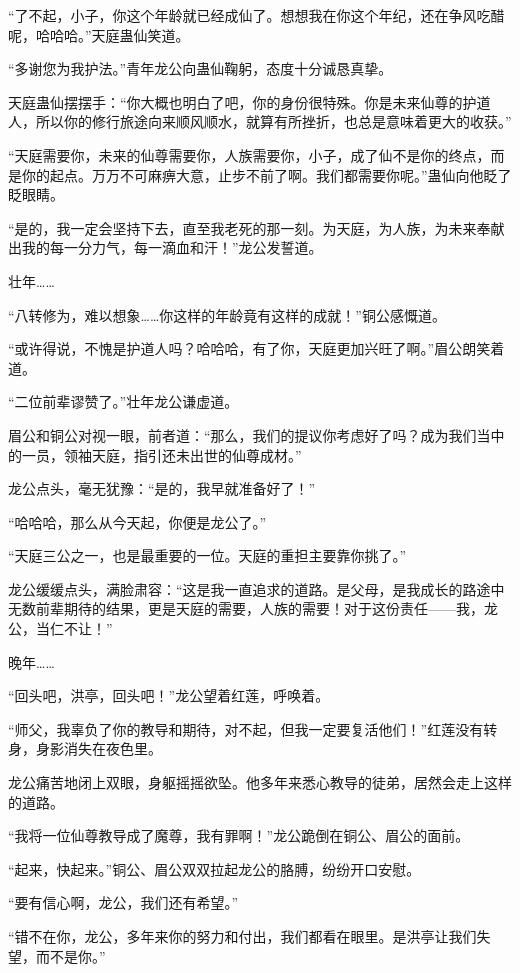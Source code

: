 \begin{this_body}
“了不起，小子，你这个年龄就已经成仙了。想想我在你这个年纪，还在争风吃醋呢，哈哈哈。”天庭蛊仙笑道。

“多谢您为我护法。”青年龙公向蛊仙鞠躬，态度十分诚恳真挚。

天庭蛊仙摆摆手：“你大概也明白了吧，你的身份很特殊。你是未来仙尊的护道人，所以你的修行旅途向来顺风顺水，就算有所挫折，也总是意味着更大的收获。”

“天庭需要你，未来的仙尊需要你，人族需要你，小子，成了仙不是你的终点，而是你的起点。万万不可麻痹大意，止步不前了啊。我们都需要你呢。”蛊仙向他眨了眨眼睛。

“是的，我一定会坚持下去，直至我老死的那一刻。为天庭，为人族，为未来奉献出我的每一分力气，每一滴血和汗！”龙公发誓道。

壮年……

“八转修为，难以想象……你这样的年龄竟有这样的成就！”铜公感慨道。

“或许得说，不愧是护道人吗？哈哈哈，有了你，天庭更加兴旺了啊。”眉公朗笑着道。

“二位前辈谬赞了。”壮年龙公谦虚道。

眉公和铜公对视一眼，前者道：“那么，我们的提议你考虑好了吗？成为我们当中的一员，领袖天庭，指引还未出世的仙尊成材。”

龙公点头，毫无犹豫：“是的，我早就准备好了！”

“哈哈哈，那么从今天起，你便是龙公了。”

“天庭三公之一，也是最重要的一位。天庭的重担主要靠你挑了。”

龙公缓缓点头，满脸肃容：“这是我一直追求的道路。是父母，是我成长的路途中无数前辈期待的结果，更是天庭的需要，人族的需要！对于这份责任——我，龙公，当仁不让！”

晚年……

“回头吧，洪亭，回头吧！”龙公望着红莲，呼唤着。

“师父，我辜负了你的教导和期待，对不起，但我一定要复活他们！”红莲没有转身，身影消失在夜色里。

龙公痛苦地闭上双眼，身躯摇摇欲坠。他多年来悉心教导的徒弟，居然会走上这样的道路。

“我将一位仙尊教导成了魔尊，我有罪啊！”龙公跪倒在铜公、眉公的面前。

“起来，快起来。”铜公、眉公双双拉起龙公的胳膊，纷纷开口安慰。

“要有信心啊，龙公，我们还有希望。”

“错不在你，龙公，多年来你的努力和付出，我们都看在眼里。是洪亭让我们失望，而不是你。”


\end{this_body}
